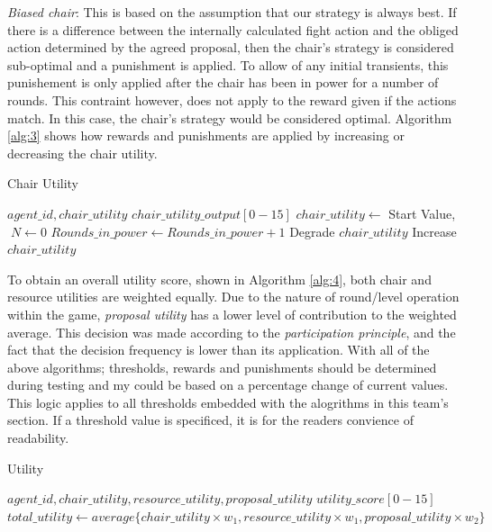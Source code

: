 \textit{Biased chair}: This is based on the assumption that our strategy is always best. If there is a difference between the internally calculated fight action and the obliged action determined by the agreed proposal, then the chair's strategy is considered sub-optimal and a punishment is applied. To allow of any initial transients, this punishement is only applied after the chair has been in power for a number of rounds. This contraint however, does not apply to the reward given if the actions match. In this case, the chair's strategy would be considered optimal. Algorithm \ref{alg:3} shows how rewards and punishments are applied by increasing or decreasing the chair utility. 

\begin{algorithm}[htb]
\caption{Chair Utility}\label{alg:3}
\begin{algorithmic} 
\scriptsize
\Require $agent\_id, chair\_utility$
\Ensure $chair\_utility\_output[0-15]$
\State $chair\_utility \leftarrow$ Start Value, $\; N \leftarrow 0$
\EndIf
{}
\State $Rounds\_in\_power \leftarrow Rounds\_in\_power+1$
\State Degrade $chair\_utility$
\EndIf
\EndIf
{}
\State Increase $chair\_utility$
\EndIf
\end{algorithmic}
\end{algorithm}

To obtain an overall utility score, shown in Algorithm \ref{alg:4}, both chair and resource utilities are weighted equally. Due to the nature of round/level operation within the game, \textit{proposal utility} has a lower level of contribution to the weighted average. This decision was made according to the \textit{participation principle}, and the fact that the decision frequency is lower than its application. With all of the above algorithms; thresholds, rewards and punishments should be determined during testing and my could be based on a percentage change of current values. This logic applies to all thresholds embedded with the alogrithms in this team's section. If a threshold value is specificed, it is for the readers convience of readability.                    


\begin{algorithm}[htb]
\caption{Utility}\label{alg:4}
\begin{algorithmic} 
\scriptsize
\Require $agent\_id, chair\_utility, resource\_utility, proposal\_utility$
\Ensure $utility\_score[0-15]$
\State $total\_utility \leftarrow average\{chair\_utility \times w_1, resource\_utility \times w_1, proposal\_utility \times w_2\}$
\EndIf
\end{algorithmic}
\end{algorithm}




